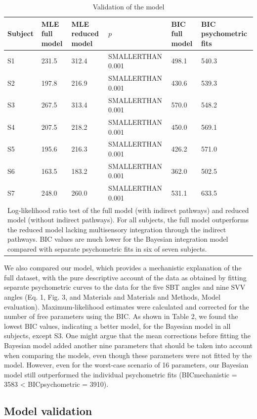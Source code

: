 \begin{table}
\begin{tabular}{llllll}
\hline
Subject & MLE full model & MLE reduced model & $p$ & BIC full model & BIC psychometric fits \\
\hline
S1 & 231.5 & 312.4 & SMALLERTHAN 0.001 & 498.1 & 540.3 \\
S2 & 197.8 & 216.9 & SMALLERTHAN 0.001 & 430.6 & 539.3 \\
S3 & 267.5 & 313.4 & SMALLERTHAN 0.001 & 570.0 & 548.2 \\
S4 & 207.5 & 218.2 & SMALLERTHAN 0.001 & 450.0 & 569.1 \\
S5 & 195.6 & 216.3 & SMALLERTHAN 0.001 & 426.2 & 571.0 \\
S6 & 163.5 & 183.2 & SMALLERTHAN 0.001 & 362.0 & 502.5 \\
S7 & 248.0 & 260.0 & SMALLERTHAN 0.001 & 531.1 & 633.5 \\ 
\hline
\multicolumn{6}{l}{Log-likelihood ratio test of the full model (with indirect pathways) and reduced model (without indirect pathways). For all subjects, the full model outperforms the reduced model lacking multisensory integration through the indirect pathways. BIC values are much lower for the Bayesian integration model compared with separate psychometric fits in six of seven subjects.} \\
\end{tabular}
\caption{Validation of the model}
\end{table}


We also compared our model, which provides a mechanistic explanation of the full dataset, with the pure descriptive account of the data as obtained by fitting separate psychometric curves to the data for the five SBT angles and nine SVV angles (Eq. 1, Fig. 3, and Materials and Materials and Methods, Model evaluation). Maximum-likelihood estimates were calculated and corrected for the number of free parameters using the BIC. As shown in Table 2, we found the lowest BIC values, indicating a better model, for the Bayesian model in all subjects, except S3. One might argue that the mean corrections before fitting the Bayesian model added another nine parameters that should be taken into account when comparing the models, even though these parameters were not fitted by the model. However, even for the worst-case scenario of 16 parameters, our Bayesian model still outperformed the individual psychometric fits (BICmechanistic = 3583 < BICpsychometric = 3910). 

\subsection{Model validation}
 
